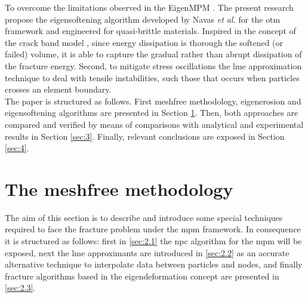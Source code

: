\documentclass[preprint,12pt,a4paper]{elsarticle}
\begin{document}
To overcome the limitations observed in the EigenMPM
\cite{Zhang_EE_2020}. The present research propose the eigensoftening
algorithm developed by Navas {\it et al.}
\cite{Navas_2017_ES,Navas2018a} for the \acrshort{otm} framework and
engineered for quasi-brittle materials. Inspired in the concept of the
crack band model \cite{Bazant83}, since energy dissipation is thorough
the softened (or failed) volume, it is able to capture the gradual rather than abrupt
dissipation of the fracture energy. Second, to mitigate stress
oscillations the \acrfull{lme} approximation technique
\cite{Arroyo2006} to deal with tensile instabilities, such those that
occurs when particles crosses an element boundary.\\

The paper is structured as follows. First meshfree methodology,
eigenerosion and eigensoftening algorithms are presented in Section
\ref{sec:2}. Then, both approaches are compared and verified by means of
comparisons with analytical and experimental results in Section
\ref{sec:3}. Finally, relevant conclusions are exposed in Section \ref{sec:4}.

\section{The meshfree methodology}
\label{sec:2}

The aim of this section is to describe and introduce some special
techniques required to face the fracture problem under the \acrshort{mpm}
framework. In consequence it is structured as follows: first in
\ref{sec:2.1} the \acrfull{npc} algorithm for the \acrshort{mpm}
will be exposed, next the \acrshort{lme} approximants are
introduced in \ref{sec:2.2} as an accurate alternative technique to
interpolate data between particles and nodes, and finally fracture
algorithms based in the eigendeformation concept are presented in \ref{sec:2.3}.
\end{document}
